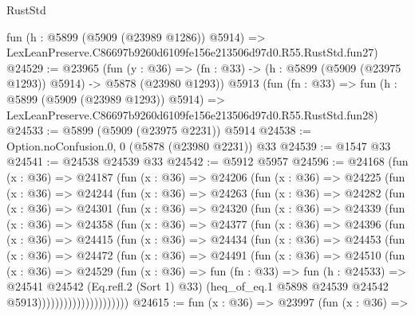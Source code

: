\begin{lexlean}{RustStd}
\begin{coremodule}
{{    fun (h : @5899 (@5909 (@23989 @1286)) @5914) =>
    LexLeanPreserve.C86697b9260d6109fe156e213506d97d0.R55.RustStd.fun27)
@24529 := @23965
    (fun (y : @36) =>
    (fn : @33) -> (h : @5899 (@5909 (@23975 @1293)) @5914) -> @5878 (@23980 @1293))
    @5913
    (fun (fn : @33) =>
    fun (h : @5899 (@5909 (@23989 @1293)) @5914) =>
    LexLeanPreserve.C86697b9260d6109fe156e213506d97d0.R55.RustStd.fun28)
@24533 := @5899 (@5909 (@23975 @2231)) @5914
@24538 := Option.noConfusion.{0, 0} (@5878 (@23980 @2231)) @33
@24539 := @1547 @33
@24541 := @24538 @24539 @33
@24542 := @5912 @5957
@24596 := @24168
    (fun (x : @36) =>
    @24187
      (fun (x : @36) =>
      @24206
        (fun (x : @36) =>
        @24225
          (fun (x : @36) =>
          @24244
            (fun (x : @36) =>
            @24263
              (fun (x : @36) =>
              @24282
                (fun (x : @36) =>
                @24301
                  (fun (x : @36) =>
                  @24320
                    (fun (x : @36) =>
                    @24339
                      (fun (x : @36) =>
                      @24358
                        (fun (x : @36) =>
                        @24377
                          (fun (x : @36) =>
                          @24396
                            (fun (x : @36) =>
                            @24415
                              (fun (x : @36) =>
                              @24434
                                (fun (x : @36) =>
                                @24453
                                  (fun (x : @36) =>
                                  @24472
                                    (fun (x : @36) =>
                                    @24491
                                      (fun (x : @36) =>
                                      @24510
                                        (fun (x : @36) =>
                                        @24529
                                          (fun (x : @36) =>
                                          fun (fn : @33) =>
                                          fun (h : @24533) =>
                                          @24541
                                            @24542
                                            (Eq.refl.{2} (Sort 1) @33)
                                            (heq_of_eq.{1}
                                              @5898
                                              @24539
                                              @24542
                                              @5913)))))))))))))))))))))
@24615 := fun (x : @36) =>
  @23997
    (fun (x : @36) =>
}}
\end{coremodule}
\end{lexlean}
